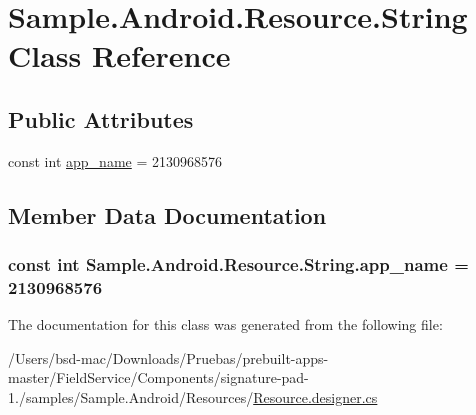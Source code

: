 \hypertarget{class_sample_1_1_android_1_1_resource_1_1_string}{\section{Sample.\+Android.\+Resource.\+String Class Reference}
\label{class_sample_1_1_android_1_1_resource_1_1_string}
}
\subsection*{Public Attributes}
\begin{DoxyCompactItemize}
\item 
const int \hyperlink{class_sample_1_1_android_1_1_resource_1_1_string_a1f77a376b01bf3a295b6872a5b630a13}{app\+\_\+name} = 2130968576
\end{DoxyCompactItemize}


\subsection{Member Data Documentation}
\hypertarget{class_sample_1_1_android_1_1_resource_1_1_string_a1f77a376b01bf3a295b6872a5b630a13}{
\subsubsection[{app\+\_\+name}]{\setlength{\rightskip}{0pt plus 5cm}const int Sample.\+Android.\+Resource.\+String.\+app\+\_\+name = 2130968576}}\label{class_sample_1_1_android_1_1_resource_1_1_string_a1f77a376b01bf3a295b6872a5b630a13}


The documentation for this class was generated from the following file\+:\begin{DoxyCompactItemize}
\item 
/\+Users/bsd-\/mac/\+Downloads/\+Pruebas/prebuilt-\/apps-\/master/\+Field\+Service/\+Components/signature-\/pad-\/1./samples/\+Sample.\+Android/\+Resources/\hyperlink{_components_2signature-pad-1_82_2samples_2_sample_8_android_2_resources_2_resource_8designer_8cs}{Resource.\+designer.\+cs}\end{DoxyCompactItemize}
